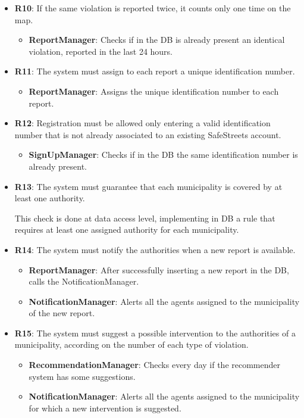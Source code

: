 \documentclass[12pt,a4paper]{report}
\begin{document}
\begin{itemize}
	\item\textbf{R10}: If the same violation is reported twice, it counts only one time on the map.
		\begin{itemize}
		\item\textbf{ReportManager}: Checks if in the DB is already present an identical violation, reported in the last 24 hours.
		\end{itemize}
			
	\item\textbf{R11}: The system must assign to each report a unique identification number.
		\begin{itemize}
		\item\textbf{ReportManager}: Assigns the unique identification number to each report.
		\end{itemize}
			
	\item\textbf{R12}: Registration must be allowed only entering a valid identification number that is not already associated to an existing SafeStreets account.
		\begin{itemize}
		\item\textbf{SignUpManager}: Checks if in the DB the same identification number is already present.
		\end{itemize}
			
	\item\textbf{R13}: The system must guarantee that each municipality is covered by at least one authority.

		This check is done at data access level, implementing in DB a rule that requires at least one assigned authority for each municipality.
			
	\item\textbf{R14}: The system must notify the authorities when a new report is available.
		\begin{itemize}
		\item\textbf{ReportManager}: After successfully inserting a new report in the DB, calls the NotificationManager.
		\item\textbf{NotificationManager}: Alerts all the agents assigned to the municipality of the new report.
		\end{itemize}
			
	\item\textbf{R15}: The system must suggest a possible intervention to the authorities of a municipality, according on the number of each type of violation.
		\begin{itemize}
		\item\textbf{RecommendationManager}: Checks every day if the recommender system has some suggestions.		
		\item\textbf{NotificationManager}: Alerts all the agents assigned to the municipality for which a new intervention is suggested.
		\end{itemize}
			

\end{itemize}
\end{document}
